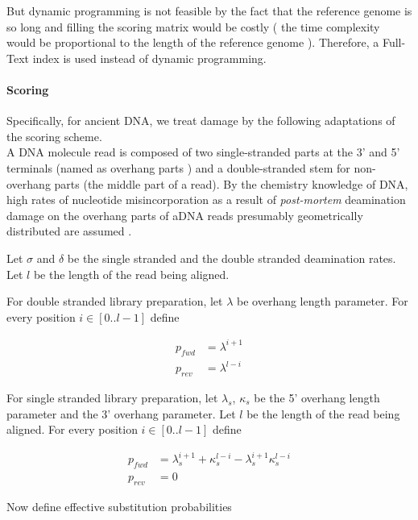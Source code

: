 \documentclass[11pt,a4paper]{report}
\begin{document}
But dynamic programming is not feasible by the fact that the reference
genome is so long and filling the scoring matrix would be costly 
( the time complexity would be proportional to the length of the 
reference genome ). Therefore, a Full-Text index is used instead 
of dynamic programming. 



\paragraph{Scoring} \label{Scoring}


Specifically, for ancient DNA, we treat damage by the following
adaptations of the scoring scheme.\\
A DNA molecule read is composed of two single-stranded parts at 
the 3' and 5' terminals (named as overhang parts ) and a 
double-stranded stem for non-overhang parts (the middle part of
a read). By the chemistry knowledge of  DNA, high rates of 
nucleotide misincorporation as a result of \emph{post-mortem} 
deamination damage on the overhang parts of aDNA reads presumably
geometrically distributed are assumed \cite{mapdamage2} . 

Let $\sigma$ and $\delta$ be the single stranded and the double stranded
deamination rates.  Let $l$ be the length of the read being aligned.  

For double stranded library preparation, let $\lambda$ be overhang
length parameter.  For every position $i \in [0..l-1]$ define 

\begin{align*}
p_{fwd} &= \lambda^{i+1} \\
p_{rev} &= \lambda^{l-i} 
\end{align*}

For single stranded library preparation, let $\lambda_s$, $\kappa_s$ be
the 5' overhang length parameter and the 3' overhang parameter.  Let $l$
be the length of the read being aligned.  For every position $i \in
[0..l-1]$ define

\begin{align*}
p_{fwd} &= \lambda_s^{i+1} + \kappa_s^{l-i} - \lambda_s^{i+1} \kappa_s^{l-i} \\
p_{rev} &= 0
\end{align*}

Now define effective substitution probabilities
\end{document}
